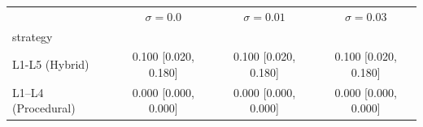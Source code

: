 \begin{tabular}{lccc}
\toprule
 & $\sigma=0.0$ & $\sigma=0.01$ & $\sigma=0.03$ \\
strategy &  &  &  \\
\midrule
L1-L5 (Hybrid) & 0.100 [0.020, 0.180] & 0.100 [0.020, 0.180] & 0.100 [0.020, 0.180] \\
L1–L4 (Procedural) & 0.000 [0.000, 0.000] & 0.000 [0.000, 0.000] & 0.000 [0.000, 0.000] \\
\bottomrule
\end{tabular}
